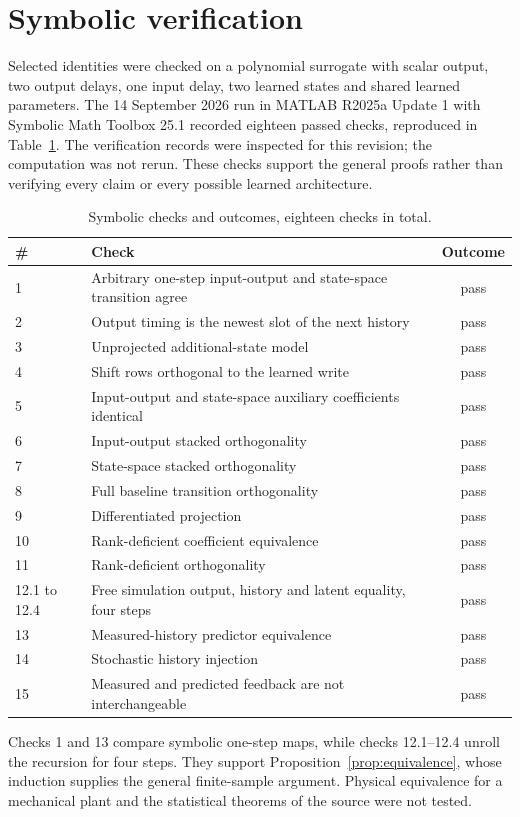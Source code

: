\documentclass[11pt,a4paper]{article}
\theoremstyle{remark}
\begin{document}
\appendix
\section{Symbolic verification}\label{sec:verification}
Selected identities were checked on a polynomial surrogate with scalar output, two output delays,
one input delay, two learned states and shared learned parameters. The 14 September 2026 run in
MATLAB R2025a Update 1 with Symbolic Math Toolbox 25.1 recorded eighteen passed checks,
reproduced in Table~\ref{tab:checks}. The verification records were inspected for this revision;
the computation was not rerun. These checks support the general proofs rather than verifying
every claim or every possible learned architecture.

\begin{table}[ht]
\centering\small
\begin{tabular}{llc}\toprule
\# & Check & Outcome\\\midrule
1 & Arbitrary one-step input-output and state-space transition agree & pass\\
2 & Output timing is the newest slot of the next history & pass\\
3 & Unprojected additional-state model & pass\\
4 & Shift rows orthogonal to the learned write & pass\\
5 & Input-output and state-space auxiliary coefficients identical & pass\\
6 & Input-output stacked orthogonality & pass\\
7 & State-space stacked orthogonality & pass\\
8 & Full baseline transition orthogonality & pass\\
9 & Differentiated projection & pass\\
10 & Rank-deficient coefficient equivalence & pass\\
11 & Rank-deficient orthogonality & pass\\
12.1 to 12.4 & Free simulation output, history and latent equality, four steps & pass\\
13 & Measured-history predictor equivalence & pass\\
14 & Stochastic history injection & pass\\
15 & Measured and predicted feedback are not interchangeable & pass\\
\bottomrule\end{tabular}
\caption{Symbolic checks and outcomes, eighteen checks in total.}\label{tab:checks}
\end{table}

Checks 1 and 13 compare symbolic one-step maps, while checks 12.1--12.4 unroll the recursion for
four steps. They support Proposition~\ref{prop:equivalence}, whose
induction supplies the general finite-sample argument. Physical equivalence for a mechanical plant
and the statistical theorems of the source were not tested.



\end{document}
